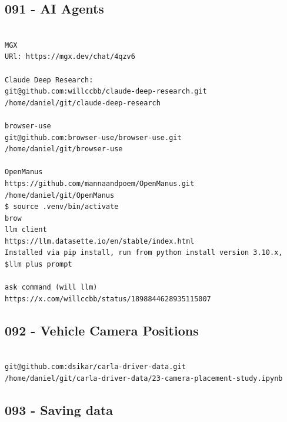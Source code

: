 \subsection{091 - AI Agents}
\label{app_res:091}

\begin{verbatim}

MGX
URl: https://mgx.dev/chat/4qzv6

Claude Deep Research:
git@github.com:willccbb/claude-deep-research.git
/home/daniel/git/claude-deep-research

browser-use
git@github.com:browser-use/browser-use.git
/home/daniel/git/browser-use

OpenManus
https://github.com/mannaandpoem/OpenManus.git
/home/daniel/git/OpenManus
$ source .venv/bin/activate
brow
llm client
https://llm.datasette.io/en/stable/index.html
Installed via pip install, run from python install version 3.10.x, $llm plus prompt

ask command (will llm)
https://x.com/willccbb/status/1898844628935115007

\end{verbatim}

\subsection{092 - Vehicle Camera Positions}
\label{app_res:092}
\begin{verbatim}

git@github.com:dsikar/carla-driver-data.git
/home/daniel/git/carla-driver-data/23-camera-placement-study.ipynb

\end{verbatim}

\subsection{093 - Saving data}
\label{app_res:093}

